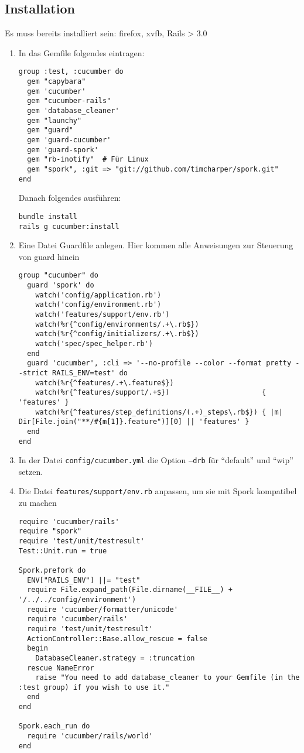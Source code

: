 \subsection*{Installation}
Es muss bereits installiert sein: firefox, xvfb, Rails > 3.0 
\begin{enumerate}
 \item In das Gemfile folgendes eintragen:
 \begin{lstlisting}[caption=RAILS\_ROOT/Gemfile]
group :test, :cucumber do
  gem "capybara"
  gem 'cucumber'
  gem "cucumber-rails"
  gem 'database_cleaner'
  gem "launchy"
  gem "guard"
  gem 'guard-cucumber'
  gem 'guard-spork'
  gem "rb-inotify"  # Für Linux
  gem "spork", :git => "git://github.com/timcharper/spork.git"
end

 \end{lstlisting}
 Danach folgendes ausführen:
 
 \begin{verbatim}
bundle install
rails g cucumber:install
 \end{verbatim}


 \item Eine Datei Guardfile anlegen. Hier kommen alle Anweisungen zur Steuerung von guard hinein
 \begin{lstlisting}[caption=RAILS\_ROOT/Guardfile]
group "cucumber" do
  guard 'spork' do
    watch('config/application.rb')
    watch('config/environment.rb')
    watch('features/support/env.rb')
    watch(%r{^config/environments/.+\.rb$})
    watch(%r{^config/initializers/.+\.rb$})
    watch('spec/spec_helper.rb')
  end
  guard 'cucumber', :cli => '--no-profile --color --format pretty --strict RAILS_ENV=test' do
    watch(%r{^features/.+\.feature$})
    watch(%r{^features/support/.+$})                      { 'features' }
    watch(%r{^features/step_definitions/(.+)_steps\.rb$}) { |m| Dir[File.join("**/#{m[1]}.feature")][0] || 'features' }
  end
end 
\end{lstlisting}
\item In der Datei \texttt{config/cucumber.yml} die Option \texttt{--drb} für "`default"' und "`wip"' setzen. 


\item Die Datei \texttt{features/support/env.rb} anpassen, um sie mit Spork kompatibel zu machen
\begin{lstlisting}[caption=features/support/env.rb]
require 'cucumber/rails'
require "spork"
require 'test/unit/testresult'
Test::Unit.run = true

Spork.prefork do
  ENV["RAILS_ENV"] ||= "test"
  require File.expand_path(File.dirname(__FILE__) + '/../../config/environment')
  require 'cucumber/formatter/unicode' 
  require 'cucumber/rails'
  require 'test/unit/testresult'
  ActionController::Base.allow_rescue = false
  begin
    DatabaseCleaner.strategy = :truncation
  rescue NameError
    raise "You need to add database_cleaner to your Gemfile (in the :test group) if you wish to use it."
  end
end

Spork.each_run do
  require 'cucumber/rails/world'
end

\end{lstlisting}

\end{enumerate}


